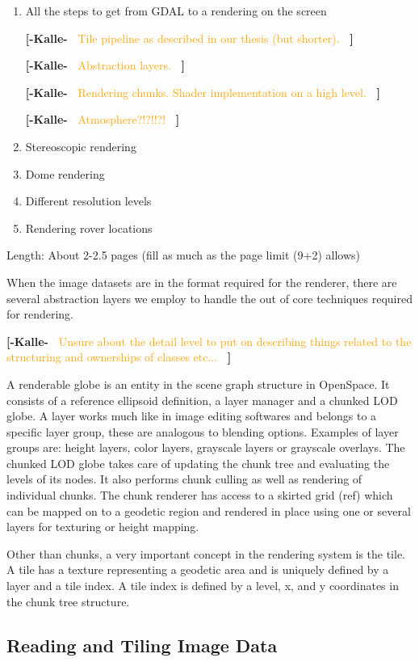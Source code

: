 \documentclass[journal]{vgtc}                %
\newcommand{\kallecomment}[1]{\textbf{[-Kalle-~}
    \textcolor{orange}{#1}
    \textbf{~]}}
\begin{document}
\begin{enumerate}
  \item All the steps to get from GDAL to a rendering on the screen
  
  \kallecomment{Tile pipeline as described in our thesis (but shorter).}
  
  \kallecomment{Abstraction layers.}
  
  \kallecomment{Rendering chunks. Shader implementation on a high level.}
  
  \kallecomment{Atmosphere?!?!!?!}
  
  \item Stereoscopic rendering
  \item Dome rendering
  \item Different resolution levels
  \item Rendering rover locations
\end{enumerate}
Length: About 2-2.5 pages (fill as much as the page limit (9+2) allows)


When the image datasets are in the format required for the renderer, there are several abstraction layers we employ to handle the out of core techniques required for rendering.

\kallecomment{Unsure about the detail level to put on describing things related to the structuring and ownerships of classes etc...}

A renderable globe is an entity in the scene graph structure in OpenSpace.
It consists of a reference ellipsoid definition, a layer manager and a chunked LOD globe.
A layer works much like in image editing softwares and belongs to a specific layer group, these are analogous to blending options.
Examples of layer groups are: height layers, color layers, grayscale layers or grayscale overlays.
The chunked LOD globe takes care of updating the chunk tree and evaluating the levels of its nodes.
It also performs chunk culling as well as rendering of individual chunks.
The chunk renderer has access to a skirted grid (ref) which can be mapped on to a geodetic region and rendered in place using one or several layers for texturing or height mapping.

Other than chunks, a very important concept in the rendering system is the tile.
A tile has a texture representing a geodetic area and is uniquely defined by a layer and a tile index.
A tile index is defined by a level, x, and y coordinates in the chunk tree structure.

\subsection{Reading and Tiling Image Data}
\end{document}
